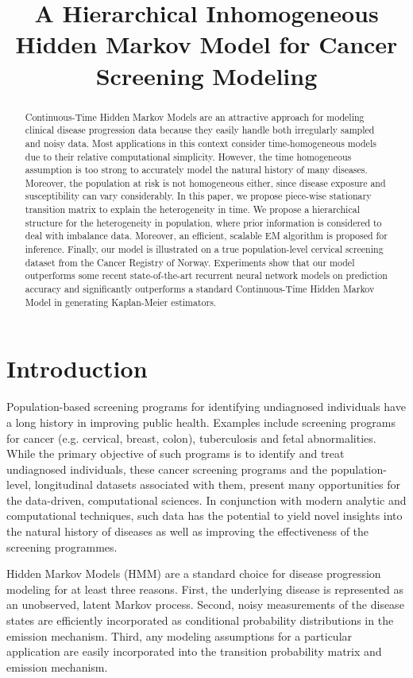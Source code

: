 \documentclass{article}
\title{A Hierarchical Inhomogeneous Hidden Markov Model for Cancer Screening Modeling}
\begin{document}
\maketitle

\begin{abstract}
 Continuous-Time Hidden Markov Models are an attractive approach for modeling clinical disease progression data because they easily handle both irregularly sampled and noisy data. Most applications in this context consider time-homogeneous models due to their relative computational simplicity. However, the time homogeneous assumption is too strong to accurately model the natural history of many diseases. Moreover, the population at risk is not homogeneous either, since disease exposure and susceptibility can vary considerably. In this paper, we propose piece-wise stationary transition matrix to explain the heterogeneity in time. We propose a hierarchical structure for the heterogeneity in population, where prior information is considered to deal with imbalance data. Moreover, an efficient, scalable EM algorithm is proposed for inference. Finally, our model is illustrated on a true population-level cervical screening dataset from the Cancer Registry of Norway. Experiments show that our model outperforms some recent state-of-the-art recurrent neural network models on prediction accuracy and significantly outperforms a standard Continuous-Time Hidden Markov Model in generating Kaplan-Meier estimators.
\end{abstract}

\section{Introduction}
Population-based screening programs for identifying undiagnosed individuals have a long history in improving public health. Examples include screening programs for cancer (e.g. cervical, breast, colon), tuberculosis and fetal abnormalities. While the primary objective of such programs is to identify and treat undiagnosed individuals, these cancer screening programs and the population-level, longitudinal datasets associated with them,  present many opportunities for the data-driven, computational sciences. In conjunction with modern analytic and computational techniques, such data has the potential to yield novel insights into the natural history of diseases as well as improving the effectiveness of the screening programmes. 

Hidden Markov Models (HMM) are a standard choice for disease progression modeling for at least three reasons. 
First, the underlying disease is represented as an unobserved, latent Markov process. Second, noisy measurements of the disease states are efficiently incorporated as conditional probability distributions in the emission mechanism. Third, any modeling assumptions for a particular application are easily incorporated into the transition probability matrix and emission mechanism.
\end{document}
